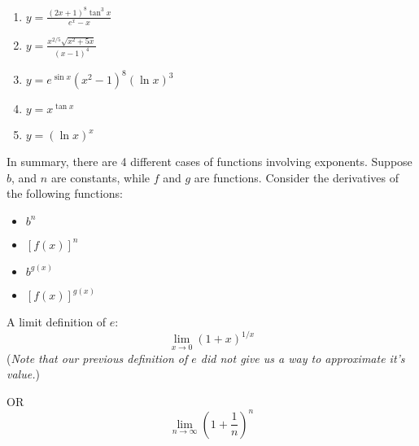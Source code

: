 \documentclass[11pt]{article}
\begin{document}
      \begin{enumerate}
    
    \item{$y = \frac{(2x+1)^8\tan^3{x}}{e^x-x}$}

      \vspace{2in}

          \item{$y = \frac{x^{2/5}\sqrt{x^2+5x}}{(x-1)^4}$}
      \vspace{2in}

                \item{$y = e^{\sin{x}}(x^2-1)^8(\ln{x})^3$}
      \vspace{2in}


      \item{$y =x^{\tan{x}}$}
    \vspace{1.2in}
      \item{$y =(\ln{x})^x$}
    \vspace{1.5in}

  \end{enumerate}
    
      In summary, there are 4 different cases of functions involving exponents.  Suppose $b$, and $n$ are constants, while $f$ and $g$ are functions.
      Consider the derivatives of the following functions:

      \begin{itemize}
      \item{$b^n$}
      \item{$[f(x)]^n$}
      \item{$b^{g(x)}$}
      \item{$[f(x)]^{g(x)}$}
      \end{itemize}

\vspace{.5in}

A limit definition of $e$:
\begin{displaymath}
\lim_{x\to 0}\left(1 + x  \right)^{1/x}
  \end{displaymath}
(\emph{Note that our previous definition of $e$ did not give us a way to approximate it's value.})
  \vspace{2in}

OR
\begin{displaymath}
\lim_{n\to \infty}\left(1 + \frac{1}{n}  \right)^n
  \end{displaymath}
\end{document}
